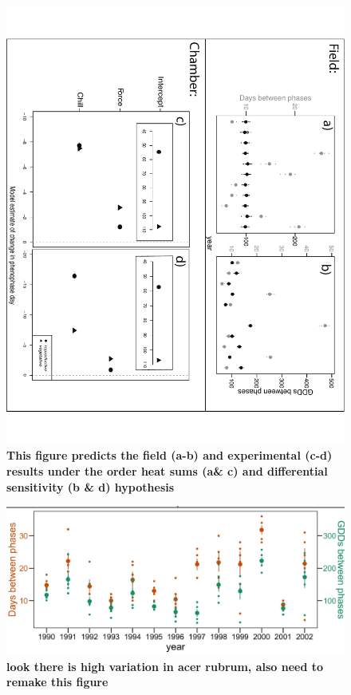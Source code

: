 \documentclass[11pt]{article}
\begin{document}
\begin{figure}[h!]
\centering
 \includegraphics[width=.8\textwidth,angle =90]{..//Plots/Flobuds_manuscript_figs/simulationfigure.pdf}
   \caption{\textbf{This figure predicts the field (a-b) and experimental (c-d) results under the order heat sums (a\& c) and differential sensitivity (b \& d) hypothesis}}
    \label{fig:field}
\end{figure}

\begin{figure}[h!]
    \centering
 \includegraphics[width=\textwidth]{..//Plots/Flobuds_manuscript_figs/hypothesis1_acerub.jpeg}
    \caption{\textbf{look there is high variation in acer rubrum, also need to remake this figure}}
    \label{fig:acerub}
\end{figure}
\end{document}
